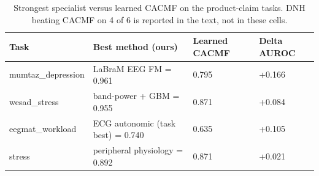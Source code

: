 \begin{table}[t]
\centering
\footnotesize
\caption{Strongest specialist versus learned CACMF on the product-claim tasks. DNH beating CACMF on 4 of 6 is reported in the text, not in these cells.}
\label{tab:fusion}
\begin{tabular}{p{3.2cm}p{5.5cm}p{2.4cm}p{2.4cm}}
\toprule
Task & Best method (ours) & Learned CACMF & Delta AUROC \\
\midrule
mumtaz\_depression & LaBraM EEG FM = 0.961 & 0.795 & +0.166 \\
wesad\_stress & band-power + GBM = 0.955 & 0.871 & +0.084 \\
eegmat\_workload & ECG autonomic (task best) = 0.740 & 0.635 & +0.105 \\
stress & peripheral physiology = 0.892 & 0.871 & +0.021 \\
\bottomrule
\end{tabular}
\end{table}
